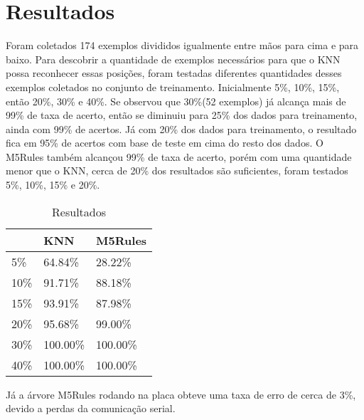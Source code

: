 \section{Resultados}

Foram coletados 174 exemplos divididos igualmente entre mãos para cima e para baixo. Para descobrir a quantidade de exemplos necessários para que o KNN possa reconhecer essas posições, foram testadas diferentes quantidades desses exemplos coletados no conjunto de treinamento. Inicialmente 5\%, 10\%, 15\%, então 20\%, 30\% e 40\%. Se observou que 30\%(52 exemplos) já alcança mais de 99\% de taxa de acerto, então se diminuiu para 25\% dos dados para treinamento, ainda com 99\% de acertos. Já com 20\% dos dados para treinamento, o resultado fica em 95\% de acertos com base de teste em cima do resto dos dados. O M5Rules também alcançou 99\% de taxa de acerto, porém com uma quantidade menor que o KNN, cerca de 20\% dos resultados são suficientes, foram testados 5\%, 10\%, 15\% e 20\%. 

\begin{table}[h]
\centering
\caption{Resultados}
\label{my-label}
\begin{tabular}{|l|l|l|}
\hline	
     & KNN & M5Rules \\
\hline	
5\%  & 64.84\% & 28.22\% \\
\hline	
10\% & 91.71\% & 88.18\% \\
\hline	
15\% & 93.91\% & 87.98\% \\
\hline	
20\% & 95.68\% & 99.00\% \\
\hline	
30\% & 100.00\% & 100.00\% \\
\hline	
40\% & 100.00\% & 100.00\% \\
\hline	
\end{tabular}
\end{table}

Já a árvore M5Rules rodando na placa obteve uma taxa de erro de cerca de 3\%, devido a perdas da comunicação serial.
